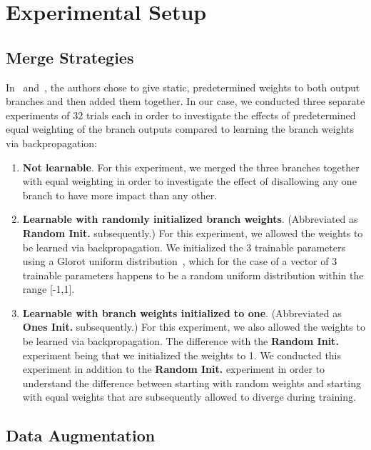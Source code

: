 \documentclass{article}
\newcommand{\rightparenthesis}{)}
\begin{document}
\section{Experimental Setup}\label{sec:experimental_setup}

\subsection{Merge Strategies}

In~\cite{Szegedy2015a} and~\cite{Szegedy2015b}, the authors chose to give static, predetermined weights to both output branches and then added them together.  In our case, we conducted three separate experiments of 32 trials each in order to investigate the effects of predetermined equal weighting of the branch outputs compared to learning the branch weights via backpropagation:

\begin{enumerate}[label=\arabic*\rightparenthesis]
\item \textbf{Not learnable}.  For this experiment, we merged the three branches together with equal weighting in order to investigate the effect of disallowing any one branch to have more impact than any other.
\item \textbf{Learnable with randomly initialized branch weights}. (Abbreviated as \textbf{Random Init.} subsequently.)  For this experiment, we allowed the weights to be learned via backpropagation.  We initialized the 3 trainable parameters using a Glorot uniform distribution~\cite{Glorot2010}, which for the case of a vector of 3 trainable parameters happens to be a random uniform distribution within the range [-1,1].
\item \textbf{Learnable with branch weights initialized to one}.  (Abbreviated as \textbf{Ones Init.} subsequently.)  For this experiment, we also allowed the weights to be learned via backpropagation.  The difference with the \textbf{Random Init.} experiment being that we initialized the weights to 1.  We conducted this experiment in addition to the \textbf{Random Init.} experiment in order to understand the difference between starting with random weights and starting with equal weights that are subsequently allowed to diverge during training.
\end{enumerate}

\subsection{Data Augmentation}
\end{document}
